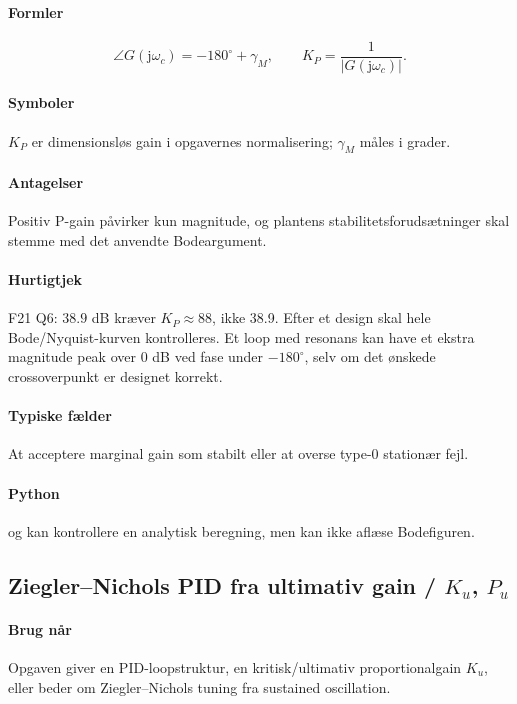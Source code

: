 \paragraph{Formler}
\begin{equation}
\label{eq:p-gain-margin-design}
\angle G(\mathrm{j}\omega_c)=-180^\circ+\gamma_M,\qquad
K_P=\frac1{|G(\mathrm{j}\omega_c)|}.
\end{equation}

\paragraph{Symboler}
\(K_P\) er dimensionsløs gain i opgavernes normalisering; \(\gamma_M\) måles i grader.

\paragraph{Antagelser}
Positiv P-gain påvirker kun magnitude, og plantens stabilitetsforudsætninger skal
stemme med det anvendte Bodeargument.

\paragraph{Hurtigtjek}
F21 Q6: \(38.9\) dB kræver \(K_P\approx88\), ikke 38.9.
Efter et design skal hele Bode/Nyquist-kurven kontrolleres. Et loop med resonans kan
have et ekstra magnitude peak over 0 dB ved fase under \(-180^\circ\), selv om det
ønskede crossoverpunkt er designet korrekt.

\paragraph{Typiske fælder}
At acceptere marginal gain som stabilt eller at overse type-0 stationær fejl.

\paragraph{Python}
 og  kan kontrollere
en analytisk beregning, men kan ikke aflæse Bodefiguren.

\subsection{Ziegler--Nichols PID fra ultimativ gain / \(K_u\), \(P_u\)}
\label{sec:ziegler}

\paragraph{Brug når}
Opgaven giver en PID-loopstruktur, en kritisk/ultimativ proportionalgain \(K_u\), eller
beder om Ziegler--Nichols tuning fra sustained oscillation.

